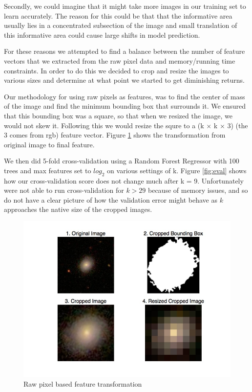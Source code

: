 \documentclass[10pt]{article}
\begin{document}
Secondly, we could imagine that it might take more images in our training set to learn accurately. The reason for this could be that that the informative area usually lies in a concentrated subsection of the image and small translation of this informative area could cause large shifts in model prediction.

For these reasons we attempted to find a balance between the number of feature vectors that we extracted from the raw pixel
data and memory/running time constraints. In order to do this we decided to crop and resize the images to various sizes
and determine at what point we started to get diminishing returns.

Our methodology for using raw pixels as features, was to find the center of mass of the image and find the minimum bounding box that surrounds it. We ensured that this bounding box was a square, so that when we resized the image, we would not skew it. Following this we would resize the squre to a (k × k × 3) (the 3 comes from rgb) feature vector. Figure \ref{fig:raw} shows the transformation from original image to final feature.

We then did 5-fold cross-validation using a Random Forest Regressor with 100 trees and max features
set to $log_2$ on various settings of k. Figure \ref{fig:eval} shows how our cross-validation score
does not change much after k = 9. Unfortunately were not able to run cross-validation for $k > 29$
because of memory issues, and so do not have a clear picture of how the validation error might
behave as $k$ approaches the native size of the cropped images.

\begin{figure}[h]
\begin{center}
\includegraphics[scale=0.4]{images/hand_engineered_features.jpg}
\caption{Raw pixel based feature transformation}
\end{center}
\label{fig:raw}
\end{figure}
\end{document}
